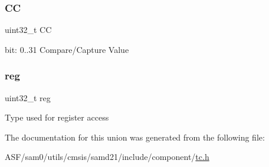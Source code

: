 \subsubsection{\texorpdfstring{CC}{CC}}
{\footnotesize\ttfamily uint32\+\_\+t CC}

bit\+: 0..31 Compare/\+Capture Value \mbox{\label{union_t_c___c_o_u_n_t32___c_c___type_a6b91636401516a477989a336376d7b40}} 
\subsubsection{\texorpdfstring{reg}{reg}}
{\footnotesize\ttfamily uint32\+\_\+t reg}

Type used for register access 

The documentation for this union was generated from the following file\+:\begin{DoxyCompactItemize}
\item 
A\+S\+F/sam0/utils/cmsis/samd21/include/component/\mbox{\hyperlink{utils_2cmsis_2samd21_2include_2component_2tc_8h}{tc.\+h}}\end{DoxyCompactItemize}
